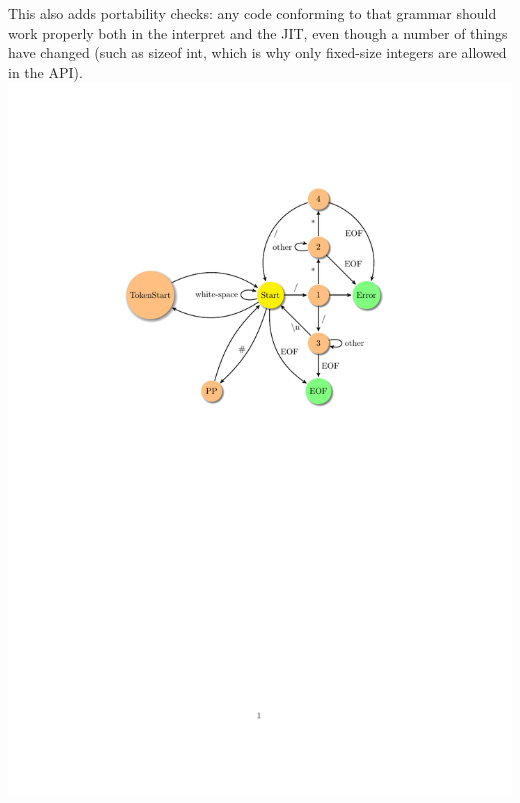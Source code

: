 This also adds portability checks: any code conforming to that grammar should
work properly both in the interpret and the JIT, even though a number of things
have changed (such as sizeof int, which is why only fixed-size integers are
allowed in the API).
\includegraphics{ifacegen-automata.pdf}
%

